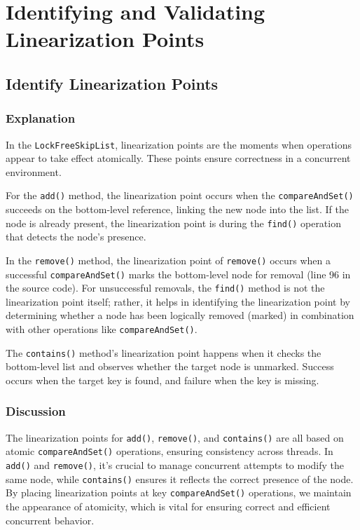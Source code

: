 \documentclass{article}
\begin{document}
\newpage
\section{Identifying and Validating Linearization Points}

\subsection{Identify Linearization Points}

\subsubsection{Explanation}
In the \texttt{LockFreeSkipList}, linearization points are the moments when operations appear to take effect atomically. These points ensure correctness in a concurrent environment.

For the \texttt{add()} method, the linearization point occurs when the \texttt{compareAndSet()} succeeds on the bottom-level reference, linking the new node into the list. If the node is already present, the linearization point is during the \texttt{find()} operation that detects the node’s presence.

In the \texttt{remove()} method, the linearization point of \texttt{remove()} occurs when a successful \texttt{compareAndSet()} marks the bottom-level node for removal (line 96 in the source code). For unsuccessful removals, the \texttt{find()} method is not the linearization point itself; rather, it helps in identifying the linearization point by determining whether a node has been logically removed (marked) in combination with other operations like \texttt{compareAndSet()}.

The \texttt{contains()} method’s linearization point happens when it checks the bottom-level list and observes whether the target node is unmarked. Success occurs when the target key is found, and failure when the key is missing.


\subsubsection{Discussion}
The linearization points for \texttt{add()}, \texttt{remove()}, and \texttt{contains()} are all based on atomic \texttt{compareAndSet()} operations, ensuring consistency across threads. In \texttt{add()} and \texttt{remove()}, it’s crucial to manage concurrent attempts to modify the same node, while \texttt{contains()} ensures it reflects the correct presence of the node. By placing linearization points at key \texttt{compareAndSet()} operations, we maintain the appearance of atomicity, which is vital for ensuring correct and efficient concurrent behavior.
\end{document}

